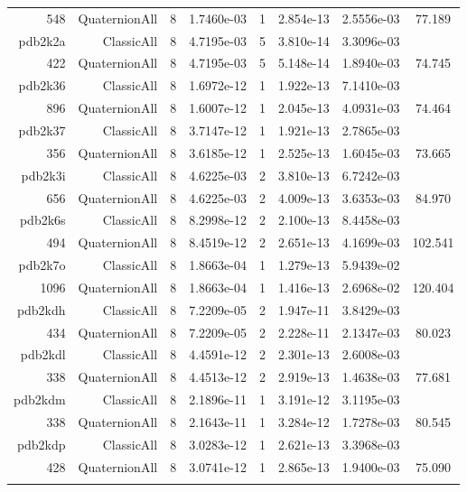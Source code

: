 \begin{xltabular}{\textwidth}{r|rcS[table-format=1.4e+2]cS[table-format=1.3e+2]S[table-format=1.4e+2]S[table-format=-1.3]}
548 & QuaternionAll & 8 & 1.7460e-03 & 1 & 2.854e-13 & 2.5556e-03 & 77.189\\  \addlinespace
pdb2k2a & ClassicAll & 8 & 4.7195e-03 & 5 & 3.810e-14 & 3.3096e-03 & \\
422 & QuaternionAll & 8 & 4.7195e-03 & 5 & 5.148e-14 & 1.8940e-03 & 74.745\\  \addlinespace
pdb2k36 & ClassicAll & 8 & 1.6972e-12 & 1 & 1.922e-13 & 7.1410e-03 & \\
896 & QuaternionAll & 8 & 1.6007e-12 & 1 & 2.045e-13 & 4.0931e-03 & 74.464\\  \addlinespace
pdb2k37 & ClassicAll & 8 & 3.7147e-12 & 1 & 1.921e-13 & 2.7865e-03 & \\
356 & QuaternionAll & 8 & 3.6185e-12 & 1 & 2.525e-13 & 1.6045e-03 & 73.665\\  \addlinespace
pdb2k3i & ClassicAll & 8 & 4.6225e-03 & 2 & 3.810e-13 & 6.7242e-03 & \\
656 & QuaternionAll & 8 & 4.6225e-03 & 2 & 4.009e-13 & 3.6353e-03 & 84.970\\  \addlinespace
pdb2k6s & ClassicAll & 8 & 8.2998e-12 & 2 & 2.100e-13 & 8.4458e-03 & \\
494 & QuaternionAll & 8 & 8.4519e-12 & 2 & 2.651e-13 & 4.1699e-03 & 102.541\\  \addlinespace
pdb2k7o & ClassicAll & 8 & 1.8663e-04 & 1 & 1.279e-13 & 5.9439e-02 & \\
1096 & QuaternionAll & 8 & 1.8663e-04 & 1 & 1.416e-13 & 2.6968e-02 & 120.404\\  \addlinespace
pdb2kdh & ClassicAll & 8 & 7.2209e-05 & 2 & 1.947e-11 & 3.8429e-03 & \\
434 & QuaternionAll & 8 & 7.2209e-05 & 2 & 2.228e-11 & 2.1347e-03 & 80.023\\  \addlinespace
pdb2kdl & ClassicAll & 8 & 4.4591e-12 & 2 & 2.301e-13 & 2.6008e-03 & \\
338 & QuaternionAll & 8 & 4.4513e-12 & 2 & 2.919e-13 & 1.4638e-03 & 77.681\\  \addlinespace
pdb2kdm & ClassicAll & 8 & 2.1896e-11 & 1 & 3.191e-12 & 3.1195e-03 & \\
338 & QuaternionAll & 8 & 2.1643e-11 & 1 & 3.284e-12 & 1.7278e-03 & 80.545\\  \addlinespace
pdb2kdp & ClassicAll & 8 & 3.0283e-12 & 1 & 2.621e-13 & 3.3968e-03 & \\
428 & QuaternionAll & 8 & 3.0741e-12 & 1 & 2.865e-13 & 1.9400e-03 & 75.090\\  \addlinespace

\end{xltabular}
